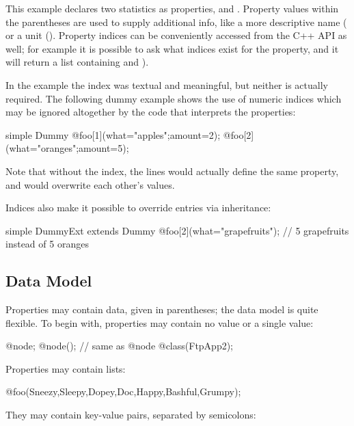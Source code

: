 This example declares two statistics as  properties,
 and . Property values within
the parentheses are used to supply additional info, like a more
descriptive name ( or a unit ().
Property indices can be conveniently accessed from the C++ API as
well; for example it is possible to ask what indices exist for the
 property, and it will return a list containing
 and ).

In the  example the index was textual and meaningful,
but neither is actually required. The following dummy example
shows the use of numeric indices which may be ignored altogether
by the code that interprets the properties:

\begin{ned}
simple Dummy {
    @foo[1](what="apples";amount=2);
    @foo[2](what="oranges";amount=5);
}
\end{ned}

Note that without the index, the lines would actually define the
same  property, and would overwrite each other's values.

Indices also make it possible to override entries via inheritance:

\begin{ned}
simple DummyExt extends Dummy {
    @foo[2](what="grapefruits"); // 5 grapefruits instead of 5 oranges
}
\end{ned}


\subsection{Data Model}
\label{sec:ned-lang:property-data-model}

Properties may contain data, given in parentheses; the data model is quite
flexible. To begin with, properties may contain no value or a single
value:

\begin{ned}
@node;
@node(); // same as @node
@class(FtpApp2);
\end{ned}

Properties may contain lists:

\begin{ned}
@foo(Sneezy,Sleepy,Dopey,Doc,Happy,Bashful,Grumpy);
\end{ned}

They may contain key-value pairs, separated by semicolons:

